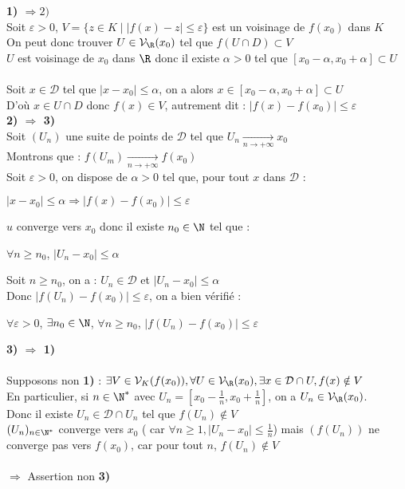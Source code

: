 \documentclass[12pt,a4paper]{report}
\begin{document}
\begin{demo}{}
\textbf{1) $\Longrightarrow 2)$}\\
Soit $\varepsilon > 0$, $V=\lbrace z\in K \mid \lvert f(x) -z \rvert \leq \varepsilon \rbrace$ est un voisinage de $f(x_0)$ dans $K$ \\
On peut donc trouver $U \in \mathcal{V}_\R (x_0)$ tel que $f(U\cap D) \subset V$ \\
$U$ est voisinage de $x_0$ dans $\R$ donc il existe $\alpha > 0$ tel que $[x_0 - \alpha, x_0 + \alpha ]\subset U$\\
\\
Soit $x\in \mathcal{D}$ tel que $\lvert x-x_0 \rvert \leq \alpha$, on a alors $x\in [x_0 - \alpha , x_0 + \alpha] \subset U$ \\
D'où $x\in U \cap D$ donc $f(x) \in V$, autrement dit : $\lvert f(x) - f(x_0)\rvert \leq \varepsilon$
\\
\textbf{2) $\Longrightarrow$ 3)}\\
Soit $(U_n)$ une suite de points de $\mathcal{D}$ tel que $U_n \xrightarrow[n \rightarrow + \infty] {} x_0$\\
Montrons que : $f(U_m) \xrightarrow[n \rightarrow + \infty]{} f(x_0)$\\
Soit $\varepsilon > 0$, on dispose de $\alpha > 0$ tel que, pour tout $x$ dans $\mathcal{D}$ : 
\begin{center}
    $\lvert x-x_0 \rvert \leq \alpha \Longrightarrow \lvert f(x) - f(x_0) \rvert \leq \varepsilon$
\end{center}
$u$ converge vers $x_0$ donc il existe $n_0 \in \N$ tel que : 
\begin{center}
    $\forall n \geq n_0$, $\lvert U_n - x_0 \rvert \leq \alpha$
\end{center}
Soit $n\geq n_0$, on a : $U_n \in \mathcal{D}$ et $\lvert U_n -x_0 \rvert \leq \alpha$\\
Donc $ \lvert f(U_n) - f(x_0) \rvert \leq \varepsilon$, on a bien vérifié : 
\begin{center}
    $\forall \varepsilon > 0$, $\exists n_0 \in \N$, $\forall n \geq n_0$, $\lvert f(U_n) - f(x_0)\rvert \leq \varepsilon$
\end{center}
\textbf{3) $\Longrightarrow$ 1)}\\
 \\
Supposons non \textbf{1)} : $\exists V \in \mathcal{V}_{K} (f(x_0)), \forall U \in \mathcal{V}_{\R} (x_0), \exists x \in \mathcal{D} \cap U, f(x) \notin V$\\
En particulier, si $n\in \N^*$ avec $U_n = [x_0 - \frac{1}{n}, x_0 + \frac{1}{n}]$, on a $U_n \in \mathcal{V}_{\R} (x_0)$. \\ Donc il existe $U_n \in \mathcal{D}\cap U_n$ tel que $f(U_n) \notin V$\\
$(U_n)_{n \in \N^*}$ converge vers $x_0$ ( car $\forall n\geq 1, \lvert U_n - x_0\rvert \leq \frac{1}{n}$) mais $(f(U_n))$ ne converge pas vers $f(x_0)$, car pour tout $n$, $f(U_n) \notin V$\\
\\
$\Longrightarrow$ Assertion non \textbf{3)}
\end{demo}
\end{document}
